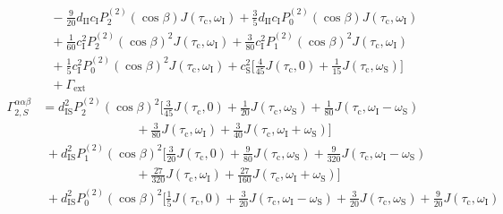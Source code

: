 \begin{appendixtext}
\begin{equation*}
\begin{split}
&\hspace{4pt}- \frac{9}{20} d_{\text{II}}c_{\text{I}}P_2^{(2)}(\cos\beta) J\left(\tau_{\text{c}},\omega_{\text{I}}\right)+ \frac{3}{5} d_{\text{II}}c_{\text{I}}P_0^{(2)}(\cos\beta) J\left(\tau_{\text{c}},\omega_{\text{I}}\right) \\ 
&\hspace{4pt}+\frac{1}{60} c_{\text{I}}^2P_2^{(2)}(\cos\beta)^2 J\left(\tau_{\text{c}},\omega_{\text{I}}\right)+\frac{3}{80} c_{\text{I}}^2P_1^{(2)}(\cos\beta)^2 J\left(\tau_{\text{c}},\omega_{\text{I}}\right) \\
&\hspace{4pt}+\frac{1}{5} c_{\text{I}}^2P_0^{(2)}(\cos\beta)^2J\left(\tau_{\text{c}},\omega_{\text{I}}\right)+c_{\text{S}}^2\bigg[\frac{4}{45}J\left(\tau_{\text{c}},0\right)+\frac{1}{15}J(\tau_{\text{c}},\omega_{\text{S}})\bigg] \\
&\hspace{4pt} +\Gamma_{\text{ext}}
\end{split}
\end{equation*}
\begin{equation*}
\begin{split}
\Gamma_{2,S}^{\alpha\alpha\beta}&=d_{\text{IS}}^2P_2^{(2)}(\cos\beta)^2\bigg[\frac{3}{45}J\left(\tau_{\text{c}},0\right) + \frac{1}{20}J\left(\tau_{\text{c}},\omega_{\text{S}}\right)
+ \frac{1}{80}J\left(\tau_{\text{c}},\omega_{\text{I}}-\omega_{\text{S}}\right)\\
&\hspace{90pt}+\frac{3}{80}J\left(\tau_{\text{c}},\omega_{\text{I}}\right)+\frac{3}{40}J\left(\tau_{\text{c}},\omega_{\text{I}}+\omega_{\text{S}}\right)\bigg] \\
&\hspace{4pt}+d_{\text{IS}}^2P_1^{(2)}(\cos\beta)^2\bigg[\frac{3}{20}J\left(\tau_{\text{c}},0\right)+ \frac{9}{80}J\left(\tau_{\text{c}},\omega_{\text{S}}\right) + \frac{9}{320}J\left(\tau_{\text{c}},\omega_{\text{I}}-\omega_{\text{S}}\right)\\
&\hspace{90pt} +\frac{27}{320}J\left(\tau_{\text{c}},\omega_{\text{I}}\right) +\frac{27}{160}J\left(\tau_{\text{c}},\omega_{\text{I}}+\omega_{\text{S}}\right)\bigg] \\
&\hspace{4pt}+d_{\text{IS}}^2P_0^{(2)}(\cos\beta)^2\bigg[\frac{1}{5}J(\tau_{\text{c}},0)+\frac{3}{20}J\left(\tau_{\text{c}},\omega_{\text{I}}-\omega_{\text{S}}\right)+\frac{3}{20}J\left(\tau_{\text{c}},\omega_{\text{S}}\right)+\frac{9}{20}J\left(\tau_{\text{c}},\omega_{\text{I}}\right) \\ 

\end{split}
\end{equation*}
\end{appendixtext}
